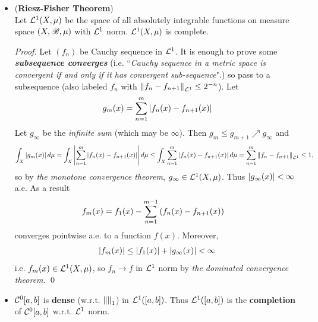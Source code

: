 \documentclass[11pt]{article}
\begin{document}
\begin{itemize}
\item \begin{theorem} (\textbf{Riesz-Fisher Theorem}) \citep{reed1980methods} \\
Let ${\mathcal L}^{1}(X, \mu)$ be the space of all absolutely integrable functions on measure space $(X, {\mathscr B}, \mu)$ with ${\mathcal L}^1$ norm. ${\mathcal L}^{1}(X, \mu)$ is complete.
\end{theorem}
\begin{proof}
Let $(f_n)$ be Cauchy sequence in ${\mathcal L}^1$. It is enough to prove some \emph{\textbf{subsequence converges}} (i.e. ``\emph{Cauchy sequence in a metric space is convergent if and only if it has convergent sub-sequence}".) so pass to a subsequence (also labeled $f_n$ with $\left\|f_n - f_{n+1}\right\|_{{\mathcal L}^1} \le 2^{-n}$). Let
\begin{align*}
g_m(x) = \sum_{n=1}^{m}\left\lvert f_n(x) - f_{n+1}(x) \right\rvert
\end{align*} Let $g_{\infty}$ be the \emph{infinite sum} (which may be $\infty$). Then $g_m \le g_{m+1} \nearrow g_{\infty}$ and
\begin{align*}
\int_{X}\left\lvert g_m(x) \right\rvert d\mu = \int_{X}\left\lvert \sum_{n=1}^{m}\left\lvert f_n(x) - f_{n+1}(x) \right\rvert \right\rvert d\mu \le \int_{X}\sum_{n=1}^{m}\left\lvert f_n(x) - f_{n+1}(x) \right\rvert d\mu = \sum_{n=1}^{m}\left\|f_n - f_{n+1}\right\|_{{\mathcal L}^1} \le 1,
\end{align*} so by \emph{the monotone convergence theorem}, $g_{\infty} \in {\mathcal L}^1(X, \mu)$. Thus $\left\lvert g_{\infty}(x) \right\rvert < \infty$ a.e. As a result
\begin{align*}
f_m(x) &= f_1(x) - \sum_{n=1}^{m-1}\left(f_n(x) - f_{n+1}(x)\right)
\end{align*} converges pointwise a.e. to a function $f(x)$. Moreover,
\begin{align*}
\left\lvert f_m(x) \right\rvert \le \left\lvert f_1(x) \right\rvert + \left\lvert g_{\infty}(x) \right\rvert < \infty
\end{align*} i.e. $f_m(x) \in {\mathcal L}^1(X, \mu)$,  so $f_n \rightarrow f$ in ${\mathcal L}^1$ norm by \emph{the dominated convergence theorem}. \qed
\end{proof}

\item \begin{proposition}
${\mathcal C}^{0}[a,b]$ is \textbf{dense} (w.r.t. $\left\|\right\|_{1}$) in ${\mathcal L}^{1}([a,b])$. Thus ${\mathcal L}^{1}([a,b])$ is the \textbf{completion} of ${\mathcal C}^{0}[a,b]$ w.r.t. ${\mathcal L}^1$ norm.
\end{proposition}
\end{itemize}

\newpage
\end{document}
